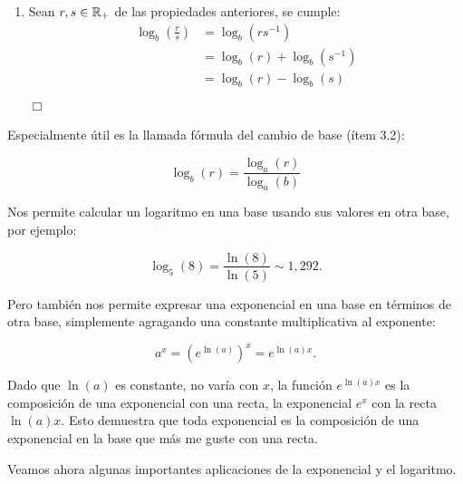 \begin{enumerate}
\item[5.] Sean $r,s\in\mathbb{R}_+$ de las propiedades anteriores, se cumple:
\begin{align*}
\log_b\left(\frac{r}{s}\right)&=\log_b(rs^{-1})\\
&=\log_b(r)+\log_b(s^{-1})\\
&=\log_b(r)-\log_b(s)\\
\end{align*}
\hfill $\Box$
\end{enumerate}

Especialmente útil es la llamada fórmula del cambio de base (ítem 3.2):

$$\log_b(r)=\frac{\log_a(r)}{\log_a(b)}$$

Nos permite calcular un logaritmo en una base usando sus valores en otra base, por ejemplo:

$$\log_5(8)=\frac{\ln(8)}{\ln(5)}\sim 1,292.$$

Pero también nos permite expresar una exponencial en una base en términos de otra base, simplemente agragando una constante multiplicativa al exponente:

$$ a^x=(e^{\ln(a)})^x=e^{\ln(a) x}.$$

Dado que $\ln(a)$ es constante, no varía con $x$, la función $e^{\ln(a) x}$ es la composición de una exponencial con una recta, la exponencial $e^x$ con la recta $\ln(a)x$.
Esto demuestra que toda exponencial es la composición de una exponencial en la base que más me guste con una recta.

Veamos ahora algunas importantes aplicaciones de la exponencial y el logaritmo.

